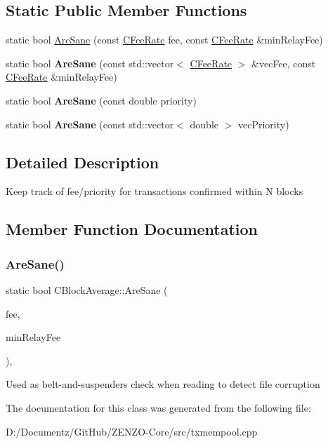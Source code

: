 \subsection*{Static Public Member Functions}
\begin{DoxyCompactItemize}
\item 
static bool \mbox{\hyperlink{class_c_block_average_a31ed22222a49a95787f9791f212ec521}{Are\+Sane}} (const \mbox{\hyperlink{class_c_fee_rate}{C\+Fee\+Rate}} fee, const \mbox{\hyperlink{class_c_fee_rate}{C\+Fee\+Rate}} \&min\+Relay\+Fee)
\item 
\mbox{\label{class_c_block_average_a92abf5615a926971eba5f6fbaadac880}} 
static bool {\bfseries Are\+Sane} (const std\+::vector$<$ \mbox{\hyperlink{class_c_fee_rate}{C\+Fee\+Rate}} $>$ \&vec\+Fee, const \mbox{\hyperlink{class_c_fee_rate}{C\+Fee\+Rate}} \&min\+Relay\+Fee)
\item 
\mbox{\label{class_c_block_average_af5b855fc318c24c1eda1998ae07a8ed2}} 
static bool {\bfseries Are\+Sane} (const double priority)
\item 
\mbox{\label{class_c_block_average_a2bdd0f3aa2eb5edddde259551965fcaf}} 
static bool {\bfseries Are\+Sane} (const std\+::vector$<$ double $>$ vec\+Priority)
\end{DoxyCompactItemize}


\subsection{Detailed Description}
Keep track of fee/priority for transactions confirmed within N blocks 

\subsection{Member Function Documentation}
\mbox{\label{class_c_block_average_a31ed22222a49a95787f9791f212ec521}} 
\subsubsection{\texorpdfstring{AreSane()}{AreSane()}}
{\footnotesize\ttfamily static bool C\+Block\+Average\+::\+Are\+Sane (\begin{DoxyParamCaption}\item[{const \mbox{\hyperlink{class_c_fee_rate}{C\+Fee\+Rate}}}]{fee,  }\item[{const \mbox{\hyperlink{class_c_fee_rate}{C\+Fee\+Rate}} \&}]{min\+Relay\+Fee }\end{DoxyParamCaption})\hspace{0.3cm}{\ttfamily [inline]}, {\ttfamily [static]}}

Used as belt-\/and-\/suspenders check when reading to detect file corruption 

The documentation for this class was generated from the following file\+:\begin{DoxyCompactItemize}
\item 
D\+:/\+Documentz/\+Git\+Hub/\+Z\+E\+N\+Z\+O-\/\+Core/src/txmempool.\+cpp\end{DoxyCompactItemize}
